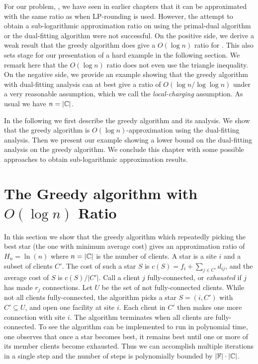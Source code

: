 \documentclass[oneside,final]{ucr}
\begin{document}
For our problem, {\FTFP}, we have seen in earlier chapters
that it can be approximated with the same ratio as {\UFL}
when LP-rounding is used. However, the attempt to obtain a
sub-logarithmic approximation ratio on {\FTFP} using the
primal-dual algorithm or the dual-fitting algorithm were not
successful. On the positive side, we derive a weak result
that the greedy algorithm does give a $O(\log n)$ ratio for
{\FTFP}. This also sets stage for our presentation of a hard
example in the following section. We remark here that the
$O(\log n)$ ratio does not even use the triangle
inequality. On the negative side, we provide an example
showing that the greedy algorithm with dual-fitting analysis
can at best give a ratio of $O(\log n/ \log\log n)$ under a
very reasonable assumption, which we call the
\emph{local-charging} assumption. As usual we have $n =
|\mathbb{C}|$.

In the following we first describe the greedy algorithm and
its analysis. We show that the greedy algorithm is $O(\log
n)$-approximation using the dual-fitting analysis. Then we
present our example showing a lower bound on the
dual-fitting analysis on the greedy algorithm. We conclude
this chapter with some possible approaches to obtain
sub-logarithmic approximation results.

\section{The Greedy algorithm with $O(\log n)$ Ratio}
\label{sec:upp}
In this section we show that the greedy algorithm which
repeatedly picking the best star (the one with minimum
average cost) gives an approximation ratio of $H_n = \ln(n)$
where $n=|\mathbb{C}|$ is the number of clients. A star is a
site $i$ and a subset of clients $C'$. The cost of such a
star $S$ is $c(S) = f_i + \sum_{j\in C'} d_{ij}$, and the
average cost of $S$ is $c(S) / |C'|$. Call a client $j$
fully-connected, or \emph{exhausted} if $j$ has made $r_j$
connections. Let $U$ be the set of not fully-connected
clients. While not all clients fully-connected, the
algorithm picks a star $S=(i,C')$ with $C' \subseteq U$, and
open one facility at site $i$. Each client in $C'$ then
makes one more connection with site $i$. The algorithm
terminates when all clients are fully-connected. To see the
algorithm can be implemented to run in polynomial time, one
observes that once a star becomes best, it remains best
until one or more of its member clients become
exhausted. Thus we can accomplish multiple iterations in a
single step and the number of steps is polynomially bounded
by $|\mathbb{F}|\cdot|\mathbb{C}|$.
\end{document}
